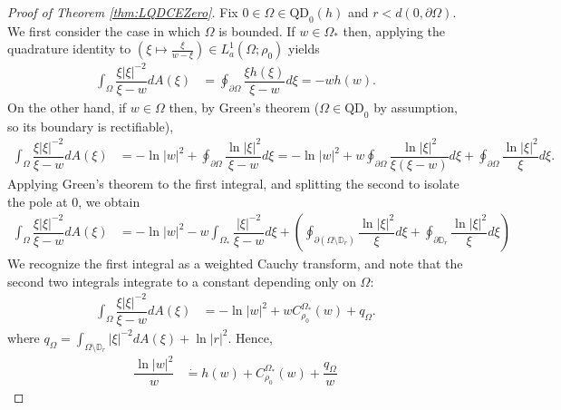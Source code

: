 \documentclass[10pt,a4paper]{amsart}
\newcommand{\D}{\mathbb{D}}
\newcommand{\IntComp}{_{\ast}} %
\newcommand{\QD}{\text{QD}}
\newcommand{\dEquals}{\dot{=}}
\begin{document}
\begin{proof}[Proof of Theorem \ref{thm:LQDCEZero}]\label{proof:LQDCEZero}
Fix $0\in\Omega\in\QD_0(h)$ and $r<d(0,\partial\Omega)$.
We first consider the case in which $\Omega$ is bounded. If $w\in\Omega\IntComp$ then, applying the quadrature identity to $\left(\xi\mapsto\frac{\xi}{w-\xi}\right)\in L_a^1(\Omega;\rho_0)$ yields
\begin{align*}
    \int_{\Omega}\dfrac{\xi|\xi|^{-2}}{\xi-w}dA(\xi)&=\oint_{\partial\Omega}\dfrac{\xi h(\xi)}{\xi-w}d\xi=-wh(w).
\end{align*}
On the other hand, if $w\in\Omega$ then, by Green's theorem ($\Omega\in\QD_0$ by assumption, so its boundary is rectifiable), 
\begin{align*}
    \int_{\Omega}\dfrac{\xi|\xi|^{-2}}{\xi-w}dA(\xi)&=-\ln|w|^2+\oint_{\partial\Omega}\dfrac{\ln|\xi|^2}{\xi-w}d\xi=-\ln|w|^2+w\oint_{\partial\Omega}\dfrac{\ln|\xi|^2}{\xi(\xi-w)}d\xi+\oint_{\partial\Omega}\dfrac{\ln|\xi|^2}{\xi}d\xi.
\end{align*}
Applying Green's theorem to the first integral, and splitting the second to isolate the pole at $0$, we obtain
\begin{align*}
    \int_{\Omega}\dfrac{\xi|\xi|^{-2}}{\xi-w}dA(\xi)&=-\ln|w|^2-w\int_{\Omega\IntComp}\dfrac{|\xi|^{-2}}{\xi-w}d\xi+\left(\oint_{\partial(\Omega\setminus\D_r)}\dfrac{\ln|\xi|^2}{\xi}d\xi+\oint_{\partial\D_r}\dfrac{\ln|\xi|^2}{\xi}d\xi\right)
\end{align*}
We recognize the first integral as a weighted Cauchy transform, and note that the second two integrals integrate to a constant depending only on $\Omega$:
\begin{align*}
    \int_{\Omega}\dfrac{\xi|\xi|^{-2}}{\xi-w}dA(\xi)&=-\ln|w|^2+wC_{\rho_0}^{\Omega\IntComp}(w)+q_{\Omega}.
\end{align*}
where $q_\Omega=\int_{\Omega\setminus\D_r}|\xi|^{-2}dA(\xi)+\ln|r|^2$. Hence,
\begin{align*}
    \dfrac{\ln|w|^2}{w}&\dEquals h(w)+C_{\rho_0}^{\Omega\IntComp}(w)+\dfrac{q_{\Omega}}{w}
\end{align*}


\end{proof}
\end{document}
